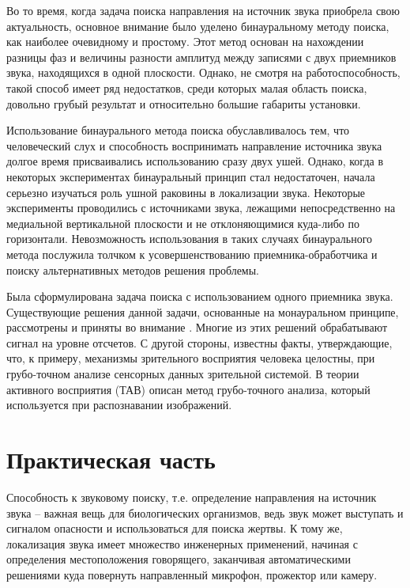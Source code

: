 Во то время, когда задача поиска направления на источник звука приобрела свою актуальность, основное внимание было уделено бинауральному методу поиска, как наиболее очевидному и простому. Этот метод основан на нахождении разницы фаз и величины разности амплитуд между записями с двух приемников звука, находящихся в одной плоскости. Однако, не смотря на работоспособность, такой способ имеет ряд недостатков, среди которых малая область поиска, довольно грубый результат и относительно большие габариты установки.

Использование бинаурального метода поиска обуславливалось тем, что человеческий слух и способность воспринимать направление источника звука долгое время присваивались использованию сразу двух ушей. Однако, когда в некоторых экспериментах бинауральный принцип стал недостаточен, начала серьезно изучаться роль ушной раковины в локализации звука. Некоторые эксперименты проводились с источниками звука, лежащими непосредственно на  медиальной вертикальной плоскости и не отклоняющимися куда-либо по горизонтали. Невозможность использования в таких случаях бинаурального метода послужила толчком к усовершенствованию приемника-обработчика и поиску альтернативных методов решения проблемы.

Была сформулирована задача поиска с использованием одного приемника звука. Существующие решения данной задачи, основанные на монауральном принципе, рассмотрены и приняты во внимание . Многие из этих решений обрабатывают сигнал на уровне отсчетов. С другой стороны, известны факты, утверждающие, что, к примеру, механизмы зрительного восприятия человека целостны, при грубо-точном анализе сенсорных данных зрительной системой. В теории активного восприятия (ТАВ) описан метод грубо-точного анализа, который используется при распознавании изображений. 

\chapter{Практическая часть}						

\setcounter{page}{3}
\rfoot{\thepage}
\fancyfootoffset[L]{-6cm}
\setlength{\footskip}{1.3cm}


Способность к звуковому поиску, т.е. определение направления на источник звука – важная вещь для биологических организмов, ведь звук может выступать и сигналом опасности и использоваться для поиска жертвы. К  тому же, локализация звука имеет множество инженерных применений, начиная с определения местоположения говорящего, заканчивая автоматическими решениями куда повернуть направленный микрофон, прожектор или камеру.

